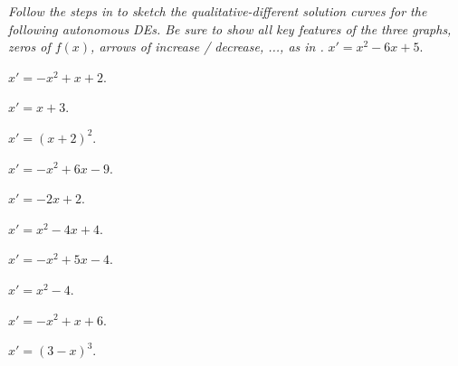 \documentclass[12pt]{book}
\begin{document}

\begin{exercise}
\textit{Follow the steps in  to sketch the qualitative-different solution curves for the following autonomous DEs. Be sure to show all key features of the three graphs, zeros of $f(x)$, arrows of increase / decrease, ..., as in .}
$x' = x^2-6x+5$.
\end{exercise}

\begin{exercise}
$x' = -x^2+x+2$.
\end{exercise}

\begin{exercise}
$x' = x+3$.
\end{exercise}

\begin{exercise}
$x' = (x+2)^2$.
\end{exercise}

\begin{exercise}
$x' = -x^2+6x-9$.
\end{exercise}

\begin{exercise}
$x' = -2x+2$.
\end{exercise}

\begin{exercise}
$x' = x^2-4x+4$.
\end{exercise}

\begin{exercise}
$x' = -x^2+5x-4$.
\end{exercise}

\begin{exercise}
$x' = x^2-4$.
\end{exercise}

\begin{exercise}
$x' = -x^2+x+6$.
\end{exercise}

\begin{exercise}
$x' = (3-x)^3$.
\end{exercise}

\printanswers
\end{document}
